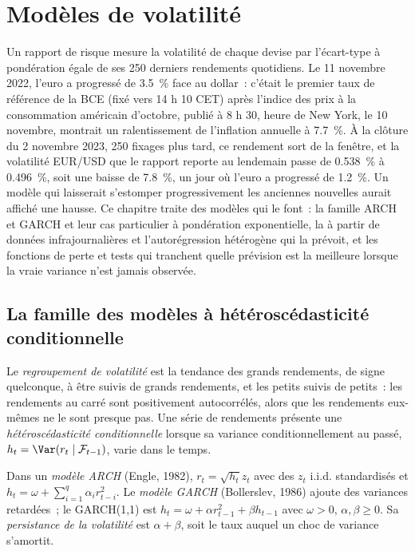 \chapter{Modèles de volatilité}\label{ch:qm:volatility-models}

Un rapport de risque mesure la volatilité de chaque devise par l'écart-type à pondération égale de ses 250 derniers rendements quotidiens. Le 11 novembre
2022, l'euro a progressé de 3.5~\% face au dollar~: c'était le premier taux de référence de la BCE (fixé vers 14 h 10 CET) après l'indice des prix à la consommation américain d'octobre, publié
à 8 h 30, heure de New York, le 10 novembre, montrait un ralentissement de l'inflation annuelle à 7.7~\%. À la clôture du 2 novembre 2023, 250 fixages plus tard, ce rendement sort de la fenêtre, et la
volatilité EUR/USD que le rapport reporte au lendemain passe de 0.538~\% à 0.496~\%, soit une baisse de 7.8~\%, un jour où l'euro a progressé de 1.2~\%. Un modèle
qui laisserait s'estomper progressivement les anciennes nouvelles aurait affiché une hausse. Ce chapitre traite des modèles qui le font~: la famille ARCH et GARCH et leur
cas particulier à pondération exponentielle, la  à partir de données infrajournalières et l'autorégression hétérogène qui la prévoit, et les
fonctions de perte et tests qui tranchent quelle prévision est la meilleure lorsque la vraie variance n'est jamais observée.

\section{La famille des modèles à hétéroscédasticité conditionnelle}

\begin{definition}\label{def:qm:volatility-models:clustering}
Le \emph{regroupement de volatilité} est la tendance des grands rendements, de signe quelconque, à être suivis de grands rendements, et les petits
suivis de petits~: les rendements au carré sont positivement autocorrélés, alors que les rendements eux-mêmes ne le sont presque pas. Une série de rendements présente une \emph{hétéroscédasticité
conditionnelle} lorsque sa variance conditionnellement au passé, $h_t = \Var(r_t \mid \mathcal F_{t-1})$, varie dans le temps.
\end{definition}

\begin{definition}\label{def:qm:volatility-models:garch}
Dans un \emph{modèle ARCH} (Engle, 1982), $r_t = \sqrt{h_t}z_t$ avec des $z_t$ i.i.d. standardisés et $h_t = \omega + \sum_{i=1}^q\alpha_ir_{t-i}^2$.
Le \emph{modèle GARCH} (Bollerslev, 1986) ajoute des variances retardées~; le GARCH(1,1) est $h_t = \omega + \alpha r_{t-1}^2 + \beta h_{t-1}$ avec $\omega > 0$,
$\alpha, \beta \ge 0$. Sa \emph{persistance de la volatilité} est $\alpha + \beta$, soit le taux auquel un choc de variance s'amortit.
\end{definition}

